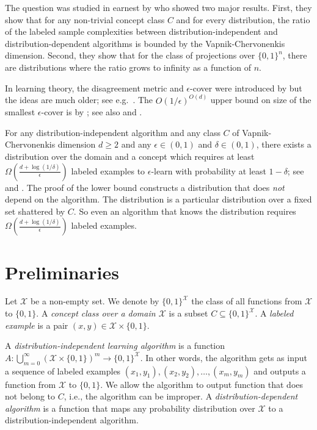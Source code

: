 \documentclass[11pt]{article}
\newcommand{\X}{\mathcal{X}}
\begin{document}
The question was studied in earnest by \citet{Darnstadt-Simon-Szorenyi-2013} who
showed two major results. First, they show that for any non-trivial concept
class $C$ and for every distribution, the ratio of the labeled sample
complexities between distribution-independent and distribution-dependent
algorithms is bounded by the Vapnik-Chervonenkis dimension. Second, they show
that for the class of projections over $\{0,1\}^n$, there are distributions
where the ratio grows to infinity as a function of $n$.

In learning theory, the disagreement metric and $\epsilon$-cover were introduced
by \citet{Benedek-Itai-1991} but the ideas are much older; see
e.g.~\citet{Dudley-1978, Dudley-1984}. The $O(1/\epsilon)^{O(d)}$ upper bound on
size of the smallest $\epsilon$-cover is by \citet[Lemma 7.13]{Dudley-1978}; see
also \citet[Chapter 4]{Devroye-Lugosi-2000} and \citet{Haussler-1995}.

For any distribution-independent algorithm and any class $C$ of
Vapnik-Chervonenkis dimension $d \ge 2$ and any $\epsilon \in (0,1)$ and $\delta
\in (0,1)$, there exists a distribution over the domain and a concept which
requires at least $\Omega \left(\frac{d + \log(1/\delta)}{\epsilon}\right)$
labeled examples to $\epsilon$-learn with probability at least $1 - \delta$;
see~\citet[Theorem 5.3]{Anthony-Bartlett-1999} and
\citet{Blumer-Ehrenfeucht-Haussler-Warmuth-1989,
Ehrenfeucht-Haussler-Kearns-Valiant-1989}. The proof of the lower bound
constructs a distribution that does \emph{not} depend on the algorithm. The
distribution is a particular distribution over a fixed set shattered by $C$. So
even an algorithm that knows the distribution requires $\Omega \left(\frac{d +
\log(1/\delta)}{\epsilon}\right)$ labeled examples.


\section{Preliminaries}
\label{section:preliminaries}

Let $\X$ be a non-empty set. We denote by $\{0,1\}^\X$ the class of all
functions from $\X$ to $\{0,1\}$. A \emph{concept class over a domain $\X$} is a
subset $C \subseteq \{0,1\}^\X$. A \emph{labeled example} is a pair $(x,y) \in
\X \times \{0,1\}$.

A \emph{distribution-independent learning algorithm} is a function
$A:\bigcup_{m=0}^\infty \left(\X \times \{0,1\} \right)^m \to \{0,1\}^\X$. In
other words, the algorithm gets as input a sequence of labeled examples $(x_1,
y_1), (x_2, y_2), \dots, (x_m, y_m)$ and outputs a function from $\X$ to
$\{0,1\}$. We allow the algorithm to output function that does not belong to
$C$, i.e., the algorithm can be improper. A \emph{distribution-dependent
algorithm} is a function that maps any probability distribution over $\X$ to a
distribution-independent algorithm.
\end{document}
